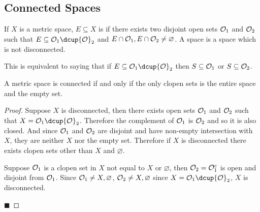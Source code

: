 \documentclass[10pt]{article}
\def\openset{{\cal O}}
\begin{document}

\bigskip

\subsection{Connected Spaces}

\begin{defn*}

    If $X$ is a metric space, $E\subseteq X$ is  if there exists two disjoint open sets $\openset_1$
    and $\openset_2$ such that $E\subseteq \openset_1\dcup\openset_2$ and $E\cap\openset_1, E\cap\openset_2\neq\varnothing$.
    A  space is a space which is not disconnected.

\end{defn*}

This is equivalent to saying that if $E\subseteq\openset_1\dcup\openset_2$ then $S\subseteq\openset_1$ or $S\subseteq\openset_2$.

\begin{prop*}

    A metric space is connected if and only if the only clopen sets is the entire space and the empty set.

\end{prop*}

\begin{proof}

    Suppose $X$ is disconnected, then there exists open sets $\openset_1$ and $\openset_2$ such that $X=\openset_1\dcup\openset_2$.
    Therefore the complement of $\openset_1$ is $\openset_2$ and so it is also closed.
    And since $\openset_1$ and $\openset_2$ are disjoint and have non-empty intersection with $X$, they are neither $X$ nor the
    empty set.
    Therefore if $X$ is disconnected there exists clopen sets other than $X$ and $\varnothing$.

    Suppose $\openset_1$ is a clopen set in $X$ not equal to $X$ or $\varnothing$, then $\openset_2=\openset_1^c$ is open and
    disjoint from $\openset_1$.
    Since $\openset_1\neq X,\varnothing$, $\openset_2\neq X,\varnothing$ since $X=\openset_1\dcup\openset_2$, $X$ is disconnected.

    \hfill$\blacksquare$

\end{proof}
\end{document}
